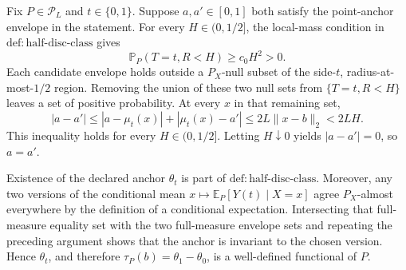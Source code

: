 Fix \(P\in\mathcal P_L\) and \(t\in\{0,1\}\).  Suppose \(a,a'\in[0,1]\) both satisfy the point-anchor envelope in the statement.  For every \(H\in(0,1/2]\), the local-mass condition in \(\mathrm{def:half\text{-}disc\text{-}class}\) gives
\[
 \mathbb P_P(T=t,R<H)\geq c_0H^2>0.
\]
Each candidate envelope holds outside a \(P_X\)-null subset of the side-\(t\), radius-at-most-\(1/2\) region.  Removing the union of these two null sets from \(\{T=t,R<H\}\) leaves a set of positive probability.  At every \(x\) in that remaining set,
\[
 |a-a'|
 \leq |a-\mu_t(x)|+|\mu_t(x)-a'|
 \leq 2L\lVert x-b\rVert_2
 <2LH.
\]
This inequality holds for every \(H\in(0,1/2]\).  Letting \(H\downarrow0\) yields \(|a-a'|=0\), so \(a=a'\).

Existence of the declared anchor \(\theta_t\) is part of \(\mathrm{def:half\text{-}disc\text{-}class}\).  Moreover, any two versions of the conditional mean \(x\mapsto\mathbb E_P[Y(t)\mid X=x]\) agree \(P_X\)-almost everywhere by the definition of a conditional expectation.  Intersecting that full-measure equality set with the two full-measure envelope sets and repeating the preceding argument shows that the anchor is invariant to the chosen version.  Hence \(\theta_t\), and therefore \(\tau_P(b)=\theta_1-\theta_0\), is a well-defined functional of \(P\).
